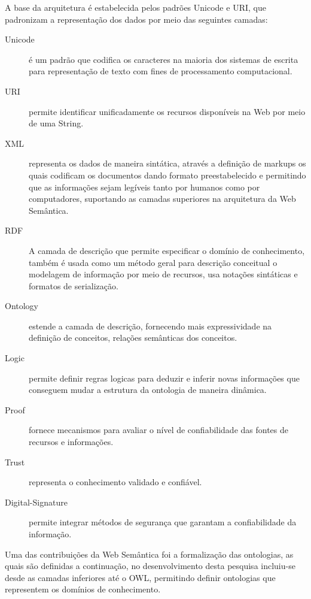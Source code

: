 A base da arquitetura é estabelecida pelos padrões \foreignlanguage{english}{Unicode}
e URI, que padronizam a representação dos dados por meio das seguintes
camadas: 
%
\begin{description}
\item [{Unicode}] \foreignlanguage{brazil}{é um padrão que codifica os
caracteres na maioria dos sistemas de escrita para representação de
texto com fines de processamento computacional.}
\item [{URI}] \foreignlanguage{brazil}{
permite identificar unificadamente os recursos disponíveis na Web
por meio de uma }String.
\item [{XML}] \foreignlanguage{brazil}{representa os dados de maneira sintática,
através a definição de }markups\foreignlanguage{brazil}{ os quais
codificam os documentos dando formato preestabelecido e permitindo
que as informações sejam legíveis tanto por humanos como por computadores,
suportando as camadas superiores na arquitetura da Web Semântica.}
\item [{RDF}] \foreignlanguage{brazil}{A camada de descrição que permite
especificar o domínio de conhecimento, também é usada como um método
geral para descrição conceitual o modelagem de informação por meio
de recursos, usa notações sintáticas e formatos de serialização.}
\item [{Ontology}] \foreignlanguage{brazil}{estende a camada de descrição,
fornecendo mais expressividade na definição de conceitos, relações
semânticas dos conceitos.}
\item [{Logic}] \foreignlanguage{brazil}{permite definir regras logicas
para deduzir e inferir novas informações que conseguem mudar a estrutura
da ontologia de maneira dinâmica.}
\item [{Proof}] \foreignlanguage{brazil}{fornece mecanismos para avaliar
o nível de confiabilidade das fontes de recursos e informações.}
\item [{Trust}] \foreignlanguage{brazil}{representa o conhecimento validado
e confiável.}
\item [{Digital-Signature}] \foreignlanguage{brazil}{permite integrar métodos
de segurança que garantam a confiabilidade da informação.}
\end{description}
%
Uma das contribuições da Web Semântica foi a formalização das ontologias,
as quais são definidas a continuação, no desenvolvimento desta pesquisa
incluiu-se desde as camadas inferiores até o \foreignlanguage{english}{OWL},
permitindo definir ontologias que representem os domínios de conhecimento.

